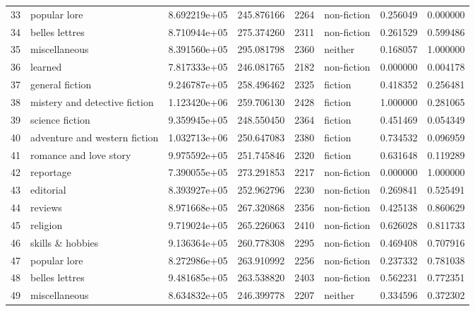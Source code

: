 \documentclass[12pt,letterpaper,twoside]{article}
\begin{document}
\begin{landscape}
\begin{longtable}{llrrrlrr}
33 &                   popular lore &  8.692219e+05 &  245.876166 &  2264 &   non-fiction &    0.256049 &     0.000000 \\
34 &                 belles lettres &  8.710944e+05 &  275.374260 &  2311 &   non-fiction &    0.261529 &     0.599486 \\
35 &                  miscellaneous &  8.391560e+05 &  295.081798 &  2360 &       neither &    0.168057 &     1.000000 \\
36 &                        learned &  7.817333e+05 &  246.081765 &  2182 &   non-fiction &    0.000000 &     0.004178 \\
37 &                general fiction &  9.246787e+05 &  258.496462 &  2325 &       fiction &    0.418352 &     0.256481 \\
38 &  mistery and detective fiction &  1.123420e+06 &  259.706130 &  2428 &       fiction &    1.000000 &     0.281065 \\
39 &                science fiction &  9.359945e+05 &  248.550450 &  2364 &       fiction &    0.451469 &     0.054349 \\
40 &  adventure and western fiction &  1.032713e+06 &  250.647083 &  2380 &       fiction &    0.734532 &     0.096959 \\
41 &         romance and love story &  9.975592e+05 &  251.745846 &  2320 &       fiction &    0.631648 &     0.119289 \\
42 &                      reportage &  7.390055e+05 &  273.291853 &  2217 &   non-fiction &    0.000000 &     1.000000 \\
43 &                      editorial &  8.393927e+05 &  252.962796 &  2230 &   non-fiction &    0.269841 &     0.525491 \\
44 &                        reviews &  8.971668e+05 &  267.320868 &  2356 &   non-fiction &    0.425138 &     0.860629 \\
45 &                       religion &  9.719024e+05 &  265.226063 &  2410 &   non-fiction &    0.626028 &     0.811733 \\
46 &               skills \& hobbies &  9.136364e+05 &  260.778308 &  2295 &   non-fiction &    0.469408 &     0.707916 \\
47 &                   popular lore &  8.272986e+05 &  263.910992 &  2256 &   non-fiction &    0.237332 &     0.781038 \\
48 &                 belles lettres &  9.481685e+05 &  263.538820 &  2403 &   non-fiction &    0.562231 &     0.772351 \\
49 &                  miscellaneous &  8.634832e+05 &  246.399778 &  2207 &       neither &    0.334596 &     0.372302 \\

\end{longtable}
\end{landscape}
\end{document}
